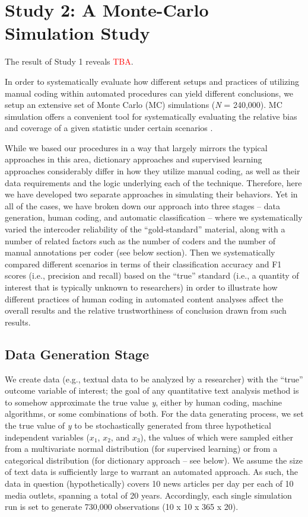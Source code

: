 \documentclass[man, 12pt, a4paper, nolmodern, noextraspace]{apa6}
\begin{document}
\section{Study 2: A Monte-Carlo Simulation Study}
    
    The result of Study 1 reveals \textcolor{red}{TBA}. 
    
    In order to systematically evaluate how different setups and practices of utilizing manual coding within automated procedures can yield different conclusions, we setup an extensive set of Monte Carlo (MC) simulations (\textit{N} = 240,000). MC simulation offers a convenient tool for systematically evaluating the relative bias and coverage of a given statistic under certain scenarios \parencites[for an example, see][]{scharkow2017measurement, leemann2017extending}. 
    
    While we based our procedures in a way that largely mirrors the typical approaches in this area, dictionary approaches and supervised learning approaches considerably differ in how they utilize manual coding, as well as their data requirements and the logic underlying each of the technique. Therefore, here we have developed two separate approaches in simulating their behaviors. Yet in all of the cases, we have broken down our approach into three stages – data generation, human coding, and automatic classification – where we systematically varied the intercoder reliability of the “gold-standard” material, along with a number of related factors such as the number of coders and the number of manual annotations per coder (see below section). Then we systematically compared different scenarios in terms of their classification accuracy and F1 scores (i.e., precision and recall) based on the \enquote{true} standard (i.e., a quantity of interest that is typically unknown to researchers) in order to illustrate how different practices of human coding in automated content analyses affect the overall results and the relative trustworthiness of conclusion drawn from such results.
    
    \subsection{Data Generation Stage}
    
    We create data (e.g., textual data to be analyzed by a researcher) with the \enquote{true} outcome variable of interest; the goal of any quantitative text analysis method is to somehow approximate the true value \textit{y}, either by human coding, machine algorithms, or some combinations of both. For the data generating process, we set the true value of \textit{y} to be stochastically generated from three hypothetical independent variables ($x_1$, $x_2$, and $x_3$), the values of which were sampled either from a multivariate normal distribution (for supervised learning) or from a categorical distribution (for dictionary approach -- see below). We assume the size of text data is sufficiently large to warrant an automated approach. As such, the data in question (hypothetically) covers 10 news articles per day per each of 10 media outlets, spanning a total of 20 years. Accordingly, each single simulation run is set to generate 730,000 observations (10 x 10 x 365 x 20).
    
\end{document}

